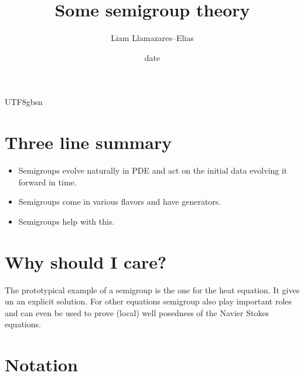 \documentclass[12pt]{article}
\begin{document}
\begin{CJK*}{UTF8}{gbsn}
	\title{Some semigroup theory}
	\author{Liam Llamazares--Elias}
	\date{date}
	\maketitle
	\section{ Three line summary}
	\begin{itemize}
		\item Semigroups evolve naturally in PDE and act on the initial data evolving it forward in time.
		\item Semigroups come in various flavors and have generators.
		\item Semigroups help with this.
	\end{itemize}
	\section{Why should I care?}
	The prototypical example of a semigroup is the one for the heat equation. It gives un an explicit solution. For other equations semigroup also play important roles and can even be used to prove
	(local) well posedness of the Navier Stokes equations.
	\section{Notation}


\end{CJK*}
\end{document}
